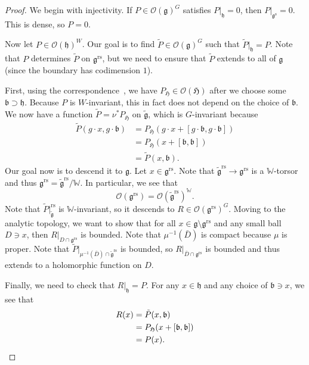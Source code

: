 \documentclass{amsart}
\theoremstyle{definition}
\theoremstyle{remark}
\theoremstyle{plain}
\theoremstyle{definition}
\theoremstyle{remark}
\newcommand{\g}{\mathfrak{g}}
\newcommand{\h}{\mathfrak{h}}
\renewcommand{\b}{\mathfrak{b}}
\newcommand{\mc}[1]{\mathcal{#1}}
\newcommand{\mf}[1]{\mathfrak{#1}}
\newcommand{\mbb}[1]{\mathbb{#1}}
\newcommand{\mr}[1]{\mathrm{#1}}
\newcommand{\on}[1]{\operatorname{#1}}
\newcommand{\1}{\mathbf{1}}
\newcommand{\2}{\mathbf{2}}
\newcommand{\3}{\mathbf{3}}
\begin{document}
\begin{proof}
    We begin with injectivity. If \(P \in \mc{O}(\g)^G\) satisfies \(P|_{\h} = 0\), then \(P|_{\g^{\on{s}}} = 0\). This is dense, so \(P = 0\).

    Now let \(P \in \mc{O}(\h)^W\). Our goal is to find \(\tilde{P} \in \mc{O}(\g)^G\) such that \(\tilde{P}|_{\h} = P\). Note that \(P\) determines \(\tilde{P}\) on \(\g^{\mr{rs}}\), but we need to ensure that \(\tilde{P}\) extends to all of \(\g\) (since the boundary has codimension \(1\)).

    First, using the correspondence~, we have \(P_{\mf{H}} \in \mc{O}(\mf{H})\) after we choose some \(\b \supset \h\). Because \(P\) is \(W\)-invariant, this in fact does not depend on the choice of \(\b\). We now have a function \(\tilde{P} = \nu^* P_{\mf{H}}\) on \(\tilde{\g}\), which is \(G\)-invariant because
    \begin{align*}
        \tilde{P}(g \cdot x, g \cdot \b) &= P_{\mf{H}}(g \cdot x + [g \cdot \b, g \cdot \b]) \\
        &= P_{\mf{H}}(x + [\b, \b])\\
        &= \tilde{P}(x, \b).
    \end{align*}
    Our goal now is to descend it to \(\g\). Let \(x \in \g^{\on{rs}}\). Note that \(\tilde{\g}^{\on{rs}} \to \g^{\on{rs}}\) is a \(\mathbb{W}\)-torsor and thus \(\g^{\on{rs}} = \tilde{\g}^{\on{rs}} / \mbb{W}\). In particular, we see that
    \[ \mc{O}(\g^{\on{rs}}) = \mc{O}(\tilde{\g}^{\on{rs}})^{\mbb{W}}. \]
    Note that \(\tilde{P}|_{\tilde{\g}}^{\on{rs}}\) is \(\mbb{W}\)-invariant, so it descends to \(R \in \mc{O}(\g^{\on{rs}})^G\). Moving to the analytic topology, we want to show that for all \(x \in \g \setminus \g^{\on{rs}}\) and any small ball \(D \ni x\), then \(R|_{D \cap \g^{\on{rs}}}\) is bounded. Note that \(\mu^{-1}(\bar{D})\) is compact because \(\mu\) is proper. Note that \(\tilde{P}|_{\mu^{-1}(\bar{D}) \cap \tilde{\g}^{\on{rs}}}\) is bounded, so \(R|_{\bar{D} \cap \g^{\on{rs}}}\) is bounded and thus extends to a holomorphic function on \(D\).

    Finally, we need to check that \(R|_{\h} = P\). For any \(x \in \h\) and any choice of \(\b \ni x\), we see that
    \begin{align*}
        R(x) &= \tilde{P}(x, \b) \\
        &= P_{\mf{H}}(x + [\b, \b]) \\
        &= P(x). \qedhere
    \end{align*}
\end{proof}
\end{document}
